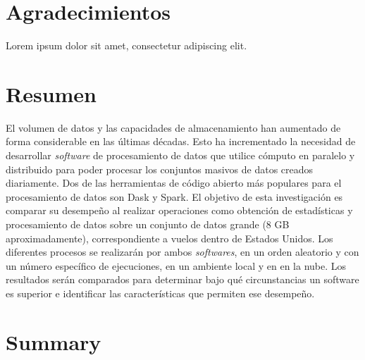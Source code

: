 \documentclass[11pt, oneside]{book}
\begin{document}

\chapter*{Agradecimientos}

\noindent Lorem ipsum dolor sit amet, consectetur adipiscing elit.



\chapter*{Resumen}

\noindent El volumen de datos y las capacidades de almacenamiento han aumentado de forma considerable en las últimas décadas. Esto ha incrementado la necesidad de desarrollar \textit{software} de procesamiento de datos que utilice cómputo en paralelo y distribuido para poder procesar los conjuntos masivos de datos creados diariamente. Dos de las herramientas de código abierto más populares para el procesamiento de datos son Dask y Spark. El objetivo de esta investigación es comparar su desempeño al realizar operaciones como obtención de estadísticas y procesamiento de datos sobre un conjunto de datos grande (8 GB aproximadamente), correspondiente a vuelos dentro de Estados Unidos. Los diferentes procesos se realizarán por ambos \textit{softwares}, en un orden aleatorio y con un número específico de ejecuciones, en un ambiente local y en en la nube. Los resultados serán comparados para determinar bajo qué circunstancias un software es superior e identificar las características que permiten ese desempeño.

\pagestyle{plain}

\noindent 


\chapter*{Summary}
\end{document}
